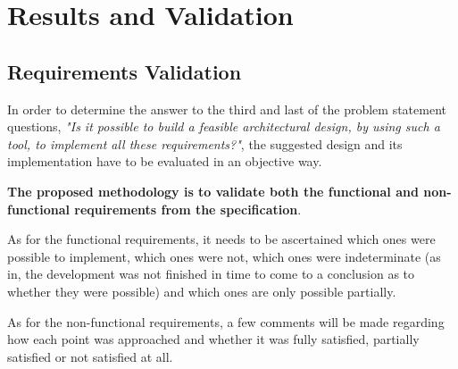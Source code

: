 \section{Results and Validation}
\label{sec:results-validation}

\subsection{Requirements Validation}
In order to determine the answer to the third and last of the problem statement questions, \textit{"Is it possible to build a feasible architectural design, by using such a tool, to implement all these requirements?"}, the suggested design and its implementation have to be evaluated in an objective way. 

\textbf{The proposed methodology is to validate both the functional and non-functional requirements from the specification}. 

As for the functional requirements, it needs to be ascertained which ones were possible to implement, which ones were not, which ones were indeterminate (as in, the development was not finished in time to come to a conclusion as to whether they were possible) and which ones are only possible partially. %

As for the non-functional requirements, a few comments will be made regarding how each point was approached and whether it was fully satisfied, partially satisfied or not satisfied at all.

